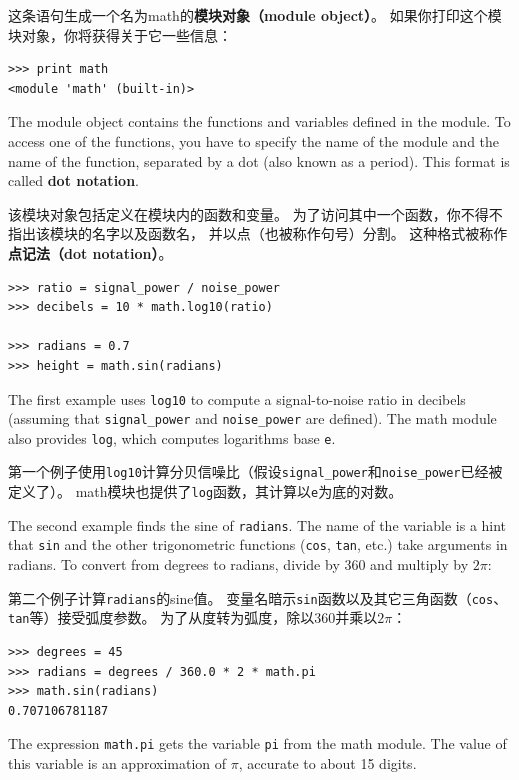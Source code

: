 \documentclass[10pt]{book}
\begin{document}
\begin{CJK}{UTF8}{gbsn}
这条语句生成一个名为math的{\bf 模块对象（module object）}。
如果你打印这个模块对象，你将获得关于它一些信息：

\begin{verbatim}
>>> print math
<module 'math' (built-in)>
\end{verbatim}
%
The module object contains the functions and variables defined in the
module.  To access one of the functions, you have to specify the name
of the module and the name of the function, separated by a dot (also
known as a period).  This format is called {\bf dot notation}.

该模块对象包括定义在模块内的函数和变量。
为了访问其中一个函数，你不得不指出该模块的名字以及函数名，
并以点（也被称作句号）分割。
这种格式被称作{\bf 点记法（dot notation）}。

\begin{verbatim}
>>> ratio = signal_power / noise_power
>>> decibels = 10 * math.log10(ratio)

>>> radians = 0.7
>>> height = math.sin(radians)
\end{verbatim}
%
The first example uses \verb"log10" to compute 
a signal-to-noise ratio in decibels (assuming that \verb"signal_power" and
\verb"noise_power" are defined).  The math module also provides {\tt log},
which computes logarithms base {\tt e}.

第一个例子使用\verb"log10"计算分贝信噪比（假设\verb"signal_power"和\verb"noise_power"已经被定义了）。
math模块也提供了{\tt log}函数，其计算以{\tt e}为底的对数。

The second example finds the sine of {\tt radians}.  The name of the
variable is a hint that {\tt sin} and the other trigonometric
functions ({\tt cos}, {\tt tan}, etc.)  take arguments in radians. To
convert from degrees to radians, divide by 360 and multiply by
$2 \pi$:

第二个例子计算{\tt radians}的sine值。
变量名暗示{\tt sin}函数以及其它三角函数（{\tt cos}、{\tt tan}等）接受弧度参数。
为了从度转为弧度，除以360并乘以$2 \pi$：

\begin{verbatim}
>>> degrees = 45
>>> radians = degrees / 360.0 * 2 * math.pi
>>> math.sin(radians)
0.707106781187
\end{verbatim}
%
The expression {\tt math.pi} gets the variable {\tt pi} from the math
module.  The value of this variable is an approximation
of $\pi$, accurate to about 15 digits.


\end{CJK}
\end{document}
